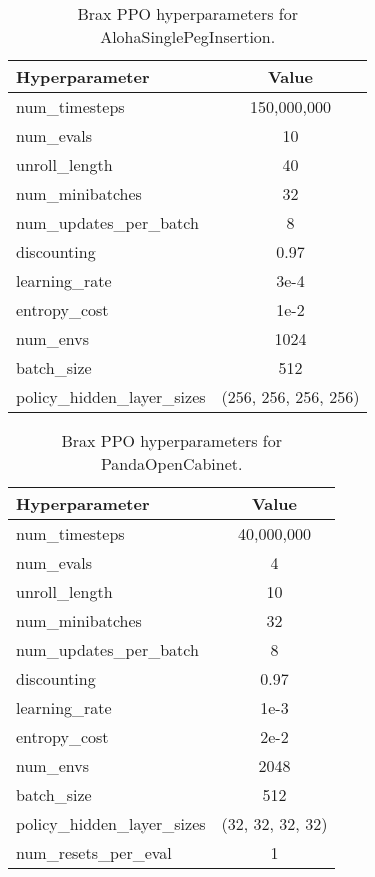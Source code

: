\begin{table}[ht]
\centering
\begin{tabular}{|l|c|} 
\hline
\textbf{Hyperparameter} & \textbf{Value} \\ \hline
num\_timesteps & 150,000,000 \\ \hline
num\_evals & 10 \\ \hline
unroll\_length & 40 \\ \hline
num\_minibatches & 32 \\ \hline
num\_updates\_per\_batch & 8 \\ \hline
discounting & 0.97 \\ \hline
learning\_rate & 3e-4 \\ \hline
entropy\_cost & 1e-2 \\ \hline
num\_envs & 1024 \\ \hline
batch\_size & 512 \\ \hline
policy\_hidden\_layer\_sizes & (256, 256, 256, 256) \\ \hline 
\end{tabular}
\caption{Brax PPO hyperparameters for AlohaSinglePegInsertion.}
\end{table}

\begin{table}[ht]
\centering
\begin{tabular}{|l|c|} 
\hline
\textbf{Hyperparameter} & \textbf{Value} \\ \hline
num\_timesteps & 40,000,000 \\ \hline
num\_evals & 4 \\ \hline
unroll\_length & 10 \\ \hline
num\_minibatches & 32 \\ \hline
num\_updates\_per\_batch & 8 \\ \hline
discounting & 0.97 \\ \hline
learning\_rate & 1e-3 \\ \hline
entropy\_cost & 2e-2 \\ \hline
num\_envs & 2048 \\ \hline
batch\_size & 512 \\ \hline
policy\_hidden\_layer\_sizes & (32, 32, 32, 32) \\ \hline 
num\_resets\_per\_eval & 1 \\ \hline
\end{tabular}
\caption{Brax PPO hyperparameters for PandaOpenCabinet.}
\end{table}

